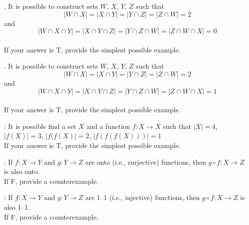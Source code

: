 \nextq
\tf. It is possible to construct sets $W$, $X$, $Y$, $Z$ such that
\[
|W \cap X| = |X \cap Y| = |Y \cap Z| = |Z \cap W| = 2
\]
and
\[
|W \cap X \cap Y| = |X \cap Y \cap Z| = |Y \cap Z \cap W| = |Z \cap W \cap X| = 0
\]
\dotfill{}
\\
If your answer is T, provide the simplest possible example.
\begin{answerlong}

\end{answerlong}

\nextq
\tf. It is possible to construct sets $W$, $X$, $Y$, $Z$ such that
\[
|W \cap X| = |X \cap Y| = |Y \cap Z| = |Z \cap W| = 2
\]
and
\[
|W \cap X \cap Y| = |X \cap Y \cap Z| = |Y \cap Z \cap W| = |Z \cap W \cap X| = 1
\]
\dotfill{}
\\
If your answer is T, provide the simplest possible example.
\begin{answerlong}

\end{answerlong}

\nextq
\tf: It is possible find a set $X$ and a function $f : X \rightarrow X$
such that $|X| = 4$, $|f(X)| = 3$, $|f(f(X)| = 2$, $|f(f(f(X)))| = 1$
\dotfill\answerbox{}
\\
If your answer is T, provide the simplest possible example.
\begin{answerlong}

\end{answerlong}

\nextq
\tf:
If $f : X \rightarrow Y$ and $g: Y \rightarrow Z$ are onto (i.e., surjective)
functions, then $g \circ f: X \rightarrow Z$ is also onto.
\dotfill\answerbox{}
\\
If F, provide a counterexample.
\begin{answerlong}

\end{answerlong}

\nextq
\tf:
If $f : X \rightarrow Y$ and $g: Y \rightarrow Z$ are 1--1 
(i.e., injective)
functions, then $g \circ f: X \rightarrow Z$ is also 1--1.
\dotfill\answerbox{}
\\
If F, provide a counterexample.
\begin{answerlong}

\end{answerlong}

